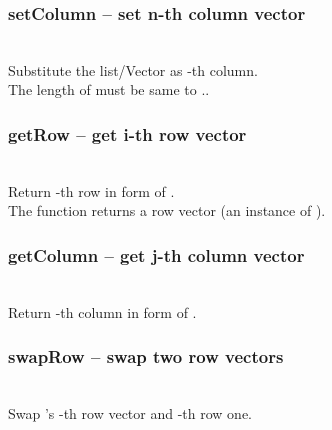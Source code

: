   \subsubsection{setColumn -- set n-th column vector}
   \\
   \spacing
   \quad Substitute the list/Vector  as -th column.\\
   \spacing
   \quad The length of  must be same to ..\\
  \subsubsection{getRow -- get i-th row vector}
   \\
   \spacing
   \quad Return -th row in form of .\\
   \spacing
   \quad The function returns a row vector (an instance of ).\\
  \subsubsection{getColumn -- get j-th column vector}
   \\
   \spacing
   \quad Return -th column in form of .\\
   \spacing
  \subsubsection{swapRow -- swap two row vectors}
   \\
   \spacing
   \quad Swap 's -th row vector and -th row one.\\
   \spacing
